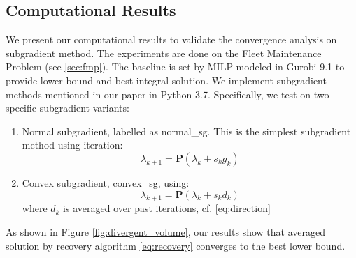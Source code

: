 \documentclass[../main]{subfiles}
\begin{document}









\subsection{Computational Results}\label{dual.computational-results}

We present our computational results to validate the convergence analysis on subgradient method.
The experiments are done on the Fleet Maintenance Problem (see \ref{sec:fmp}).
The baseline is set by MILP modeled in Gurobi 9.1 to provide lower bound and best integral solution.
We implement subgradient methods mentioned in our paper in Python 3.7. Specifically, we test on two specific subgradient variants:

\begin{enumerate}
  \item Normal subgradient, labelled as \textsf{normal\_sg}. This is the simplest subgradient method using iteration:
        \[\lambda_{k+1} = \mathbf{P}(\lambda_{k} + s_{k}g_{k})\]
  \item Convex subgradient, \textsf{convex\_sg}, using:
        \[\lambda_{k+1} = \mathbf{P}(\lambda_{k} + s_{k}d_{k})\]
        where \(d_k\) is averaged over past iterations, cf. \eqref{eq:direction}
\end{enumerate}

As shown in Figure \ref{fig:divergent_volume}, our results show that averaged solution by recovery algorithm \eqref{eq:recovery} converges to the best lower bound.
\end{document}
